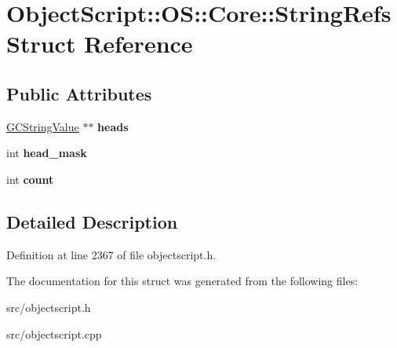 \hypertarget{struct_object_script_1_1_o_s_1_1_core_1_1_string_refs}{}\section{Object\+Script\+:\+:OS\+:\+:Core\+:\+:String\+Refs Struct Reference}
\label{struct_object_script_1_1_o_s_1_1_core_1_1_string_refs}
\subsection*{Public Attributes}
\begin{DoxyCompactItemize}
\item 
\hyperlink{struct_object_script_1_1_o_s_1_1_core_1_1_g_c_string_value}{G\+C\+String\+Value} $\ast$$\ast$ {\bfseries heads}\hypertarget{struct_object_script_1_1_o_s_1_1_core_1_1_string_refs_a3a87d42252f2c5161e826e5d23815cf0}{}\label{struct_object_script_1_1_o_s_1_1_core_1_1_string_refs_a3a87d42252f2c5161e826e5d23815cf0}

\item 
int {\bfseries head\+\_\+mask}\hypertarget{struct_object_script_1_1_o_s_1_1_core_1_1_string_refs_a36fe6e234935ffecc46ae3ada4020b50}{}\label{struct_object_script_1_1_o_s_1_1_core_1_1_string_refs_a36fe6e234935ffecc46ae3ada4020b50}

\item 
int {\bfseries count}\hypertarget{struct_object_script_1_1_o_s_1_1_core_1_1_string_refs_ad146b312b5701f88682ff39d4b0eac10}{}\label{struct_object_script_1_1_o_s_1_1_core_1_1_string_refs_ad146b312b5701f88682ff39d4b0eac10}

\end{DoxyCompactItemize}


\subsection{Detailed Description}


Definition at line 2367 of file objectscript.\+h.



The documentation for this struct was generated from the following files\+:\begin{DoxyCompactItemize}
\item 
src/objectscript.\+h\item 
src/objectscript.\+cpp\end{DoxyCompactItemize}
